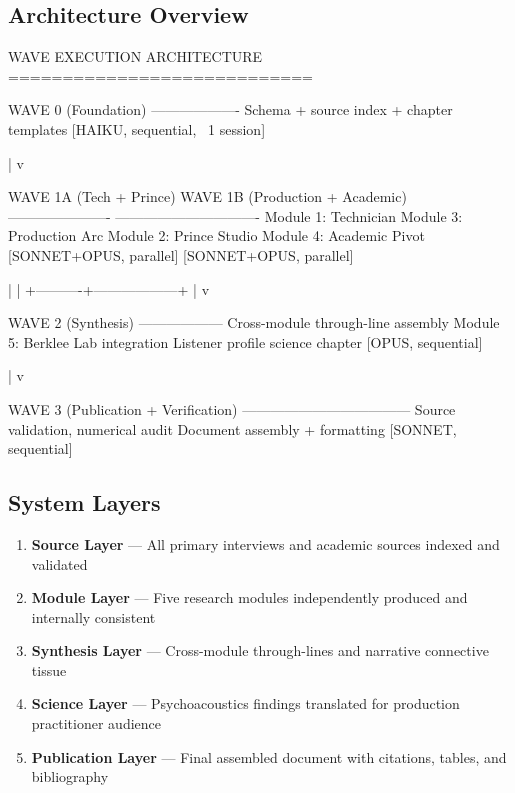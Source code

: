 \documentclass[11pt,letterpaper]{article}
\begin{document}
\subsection{Architecture Overview}

\begin{asciibox}
WAVE EXECUTION ARCHITECTURE
============================

  WAVE 0 (Foundation)
  -------------------
  Schema + source index + chapter templates
  [HAIKU, sequential, ~1 session]

         |
         v

  WAVE 1A (Tech + Prince)       WAVE 1B (Production + Academic)
  ----------------------        -------------------------------
  Module 1: Technician          Module 3: Production Arc
  Module 2: Prince Studio       Module 4: Academic Pivot
  [SONNET+OPUS, parallel]       [SONNET+OPUS, parallel]

         |                             |
         +----------+------------------+
                    |
                    v

  WAVE 2 (Synthesis)
  ------------------
  Cross-module through-line assembly
  Module 5: Berklee Lab integration
  Listener profile science chapter
  [OPUS, sequential]

                    |
                    v

  WAVE 3 (Publication + Verification)
  ------------------------------------
  Source validation, numerical audit
  Document assembly + formatting
  [SONNET, sequential]
\end{asciibox}

\subsection{System Layers}

\begin{enumerate}[leftmargin=2em]
  \item \textbf{Source Layer} --- All primary interviews and academic sources indexed and validated
  \item \textbf{Module Layer} --- Five research modules independently produced and internally consistent
  \item \textbf{Synthesis Layer} --- Cross-module through-lines and narrative connective tissue
  \item \textbf{Science Layer} --- Psychoacoustics findings translated for production practitioner audience
  \item \textbf{Publication Layer} --- Final assembled document with citations, tables, and bibliography
\end{enumerate}
\end{document}
